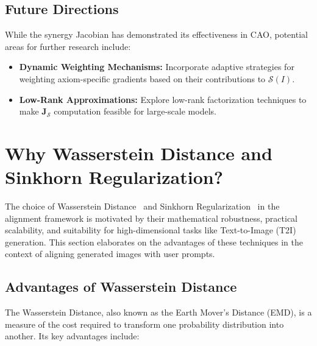 \subsection{Future Directions}
While the synergy Jacobian has demonstrated its effectiveness in CAO, potential areas for further research include:
\begin{itemize}
    \item \textbf{Dynamic Weighting Mechanisms:} Incorporate adaptive strategies for weighting axiom-specific gradients based on their contributions to \(\mathcal{S}(I)\).
    \item \textbf{Low-Rank Approximations:} Explore low-rank factorization techniques to make \(\mathbf{J}_{\mathcal{S}}\) computation feasible for large-scale models.
\end{itemize}



\section{Why Wasserstein Distance and Sinkhorn Regularization?}
\label{sec:appendix_wasserstein_Sinkhorn}

The choice of Wasserstein Distance~\cite{arjovsky2017wasserstein} and Sinkhorn Regularization~\cite{cuturi2013sinkhorn} in the alignment framework is motivated by their mathematical robustness, practical scalability, and suitability for high-dimensional tasks like Text-to-Image (T2I) generation. This section elaborates on the advantages of these techniques in the context of aligning generated images with user prompts.


\subsection{Advantages of Wasserstein Distance}

The Wasserstein Distance, also known as the Earth Mover’s Distance (EMD), is a measure of the cost required to transform one probability distribution into another. Its key advantages include:

